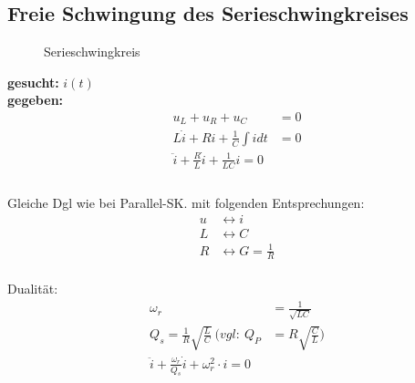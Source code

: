 \subsection{Freie Schwingung des Serieschwingkreises}

\begin{wrapfigure}{l}{0.4\textwidth}
	\centering
	
	\caption{Serieschwingkreis}
	\label{fig:SerieSKGeschlossen}
\end{wrapfigure}

\textbf{gesucht:  }$i(t)$\\
\textbf{gegeben:}
\begin{align}
	u_L + u_R + u_C &= 0\nonumber\\
	L\dot{i} + Ri + \frac{1}{C}\int{i}dt&=0\nonumber\\
	\boxed{\ddot{i}+\frac{R}{L}\dot{i}+\frac{1}{LC}i=0}
	\\
	\nonumber
\end{align}\\



Gleiche Dgl wie bei Parallel-SK. mit folgenden Entsprechungen:\\
\begin{align}
u &\leftrightarrow i\nonumber\\
L &\leftrightarrow C\nonumber\\
R &\leftrightarrow G=\frac{1}{R}\nonumber
\end{align}\\

Dualität:\\
\begin{align}
\omega_r&=\frac{1}{\sqrt{LC}}\nonumber\\
Q_s=\frac{1}{R}\sqrt{\frac{L}{C}}\ (vgl:\ Q_P&=R\sqrt{\frac{C}{L}})\nonumber\\
\boxed{\ddot i + \frac{\omega_r}{Q_s}\dot i + \omega_r^2\cdot i = 0}
\end{align}\\

